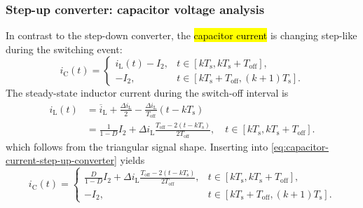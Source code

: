 \begin{frame}
    \frametitle{Step-up converter: capacitor voltage analysis}
     In contrast to the step-down converter, the \hl{capacitor current} is changing step-like during the switching event:
     \begin{equation}
        i_\mathrm{C}(t) = \begin{cases}
            i_\mathrm{L}(t) - I_2, & t\in [k T_\mathrm{s}, k T_\mathrm{s} + T_\mathrm{off}],\\
            -I_2, & t\in [k T_\mathrm{s}+ T_\mathrm{off}, (k+1) T_\mathrm{s}].
        \end{cases}
        \label{eq:capacitor-current-step-up-converter}
    \end{equation}
  The steady-state inductor current during the switch-off interval is
  \begin{equation}
    \begin{split}
        i_\mathrm{L}(t) &= \overline{i}_\mathrm{L} + \frac{\Delta i_\mathrm{L}}{2} - \frac{\Delta i_\mathrm{L}}{T_\mathrm{off}}(t-kT_\mathrm{s})\\
        &= \frac{1}{1-D}I_2 + \Delta i_\mathrm{L} \frac{T_\mathrm{off}-2(t-kT_\mathrm{s})}{2T_\mathrm{off}}, \quad t\in [k T_\mathrm{s}, k T_\mathrm{s} + T_\mathrm{off}].
    \end{split}
  \end{equation}
  which follows from the triangular signal shape. Inserting into \eqref{eq:capacitor-current-step-up-converter} yields
  \begin{equation}
    i_\mathrm{C}(t) = \begin{cases}
        \frac{D}{1-D}I_2 + \Delta i_\mathrm{L} \frac{T_\mathrm{off}-2(t-kT_\mathrm{s})}{2T_\mathrm{off}}, & t\in [k T_\mathrm{s}, k T_\mathrm{s} + T_\mathrm{off}],\\
        -I_2, & t\in [k T_\mathrm{s}+ T_\mathrm{off}, (k+1) T_\mathrm{s}].
    \end{cases}
\end{equation}
\end{frame}

